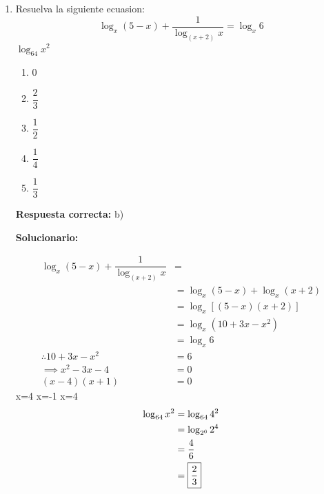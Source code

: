 \begin{enumerate}[resume]
	\vspace{2mm}
	\textbf{Solucionario:}

	Los términos independientes son iguales $1 = b^c d^a + k $ $\Longrightarrow$   $1-k = b^c d^a$ \\

	Coeficiente principal igual:
	$2 = a^c.c^a$

	$\therefore \left(\dfrac{b^d c^a}{(1-k)}\right) (a^c.c^a) = \left(\dfrac{1-k}{1-k}\right) (2) =$

	\vspace{6mm}

	\item Resuelva la siguiente ecuasion:\\
	$$\log_x(5-x) + \dfrac{1}{\log_{(x+2)} x} = \log_x 6$$
	 $\log_{64} x^2$

	\begin{enumerate}[label=\alph*)]
		\item 0
		\item $\dfrac{2}{3}$
		\item $\dfrac{1}{2}$
		\item $\dfrac{1}{4}$
		\item $\dfrac{1}{3}$
	\end{enumerate}
	\textbf{Respuesta correcta:} b)

	\vspace{2mm}
	\textbf{Solucionario:}


	\begin{align*}
		\log_x (5-x) + \dfrac{1}{\log_{(x+2)} x} &= \\
		&= \log_x (5-x) + \log_x (x+2) \\
		&= \log_x [(5-x)(x+2)] \\
		&= \log_x (10 + 3x - x^2) \\
		&= \log_x 6 \\
		\therefore 10 + 3x - x^2 &= 6 \\
		\implies x^2 - 3x - 4 &= 0 \\
		(x-4)(x+1) &= 0
	\end{align*}
	 x=4 \quad {} x=-1
	 x=4
	\begin{align*}
		\log_{64} x^2 &= \log_{64} 4^2 \\
		&= \log_{2^6} 2^4 \\
		&= \dfrac{4}{6} \\
		&= \fbox{$\dfrac{2}{3}$}
	\end{align*}


\end{enumerate}
